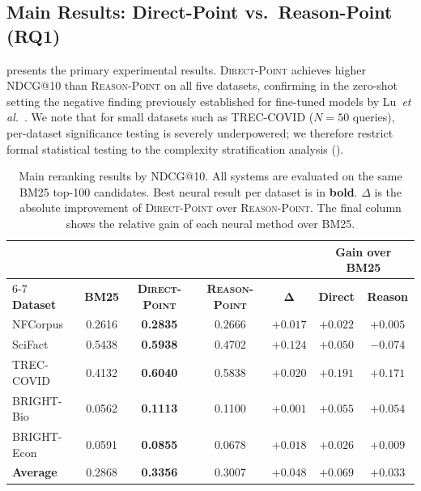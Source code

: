\documentclass[12pt]{article}
\makeatletter
\newcommand{\ndcg}{NDCG@10}
\newcommand{\direct}{\textsc{Direct-Point}}
\newcommand{\reason}{\textsc{Reason-Point}}
\newcommand{\etal}{\textit{et al.}}
\makeatother
\begin{document}
\subsection{Main Results: Direct-Point vs.\ Reason-Point (RQ1)}
\label{sec:main_results}

 presents the primary experimental results.  \direct{} achieves
higher \ndcg{} than \reason{} on all five datasets, confirming in the zero-shot
setting the negative finding previously established for fine-tuned models by
Lu~\etal~\citep{lu2025rethinking}.  We note that for small datasets such as
TREC-COVID ($N=50$ queries), per-dataset significance testing is severely
underpowered; we therefore restrict formal statistical testing to the
complexity stratification analysis ().

\begin{table}[htbp]
\caption{Main reranking results by \ndcg{}.  All systems are evaluated on
         the same BM25 top-100 candidates.  Best neural result per dataset
         is in \textbf{bold}.  $\Delta$ is the absolute improvement of
         \direct{} over \reason{}.  The final column shows the relative gain
         of each neural method over BM25.}
\label{tab:main}
\centering
\small
\setlength{\tabcolsep}{8pt}
\renewcommand{\arraystretch}{1.35}
\begin{tabular}{@{}lcccc cc@{}}
\toprule
& & & & &
\multicolumn{2}{c}{\textbf{Gain over BM25}} \\
\cmidrule(l){6-7}
\textbf{Dataset} &
\textbf{BM25} &
\textbf{\direct{}} &
\textbf{\reason{}} &
$\bm{\Delta}$ &
\textbf{Direct} & \textbf{Reason} \\
\midrule
\rowcolor{rowgray}
NFCorpus    & 0.2616 & \textbf{0.2835} & 0.2666 & $+0.017$ & $+0.022$ & $+0.005$ \\
SciFact     & 0.5438 & \textbf{0.5938} & 0.4702 & $+0.124$ & $+0.050$ & $-0.074$ \\
\rowcolor{rowgray}
TREC-COVID  & 0.4132 & \textbf{0.6040} & 0.5838 & $+0.020$ & $+0.191$ & $+0.171$ \\
BRIGHT-Bio  & 0.0562 & \textbf{0.1113} & 0.1100 & $+0.001$ & $+0.055$ & $+0.054$ \\
\rowcolor{rowgray}
BRIGHT-Econ & 0.0591 & \textbf{0.0855} & 0.0678 & $+0.018$ & $+0.026$ & $+0.009$ \\
\midrule
\textbf{Average} & 0.2868 & \textbf{0.3356} & 0.3007 & $\mathbf{+0.048}$ & $+0.069$ & $+0.033$ \\
\bottomrule
\end{tabular}
\end{table}
\end{document}
